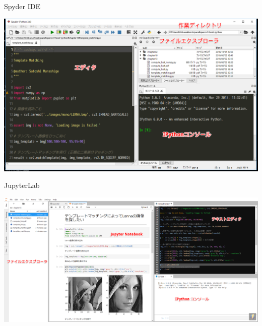 \documentclass[10pt]{beamer}
\begin{document}
	\begin{frame}{Spyder IDE}
	    \begin{center}
	        \includegraphics[width=\hsize]{figs/spyder.png}
	    \end{center}
	\end{frame}
	
	\begin{frame}{JupyterLab}
	    \begin{center}
	        \includegraphics[width=\hsize]{figs/JupyterLab.png}
	    \end{center}
	\end{frame}
	
\end{document}
